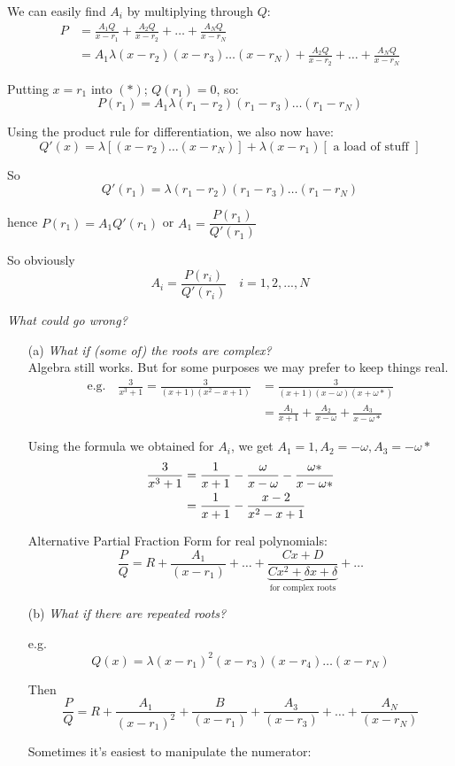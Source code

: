 \documentclass[twoside]{scrartcl}
\begin{document}
We can easily find $A_i$ by multiplying through $Q$:\vspace*{5pt}
\begin{align} \nonumber P &= \frac{A_1Q}{x-r_1} + \frac{A_2Q}{x-r_2} + \dots + \frac{A_NQ}{x-r_N}\\ \nonumber
&= A_1 \lambda(x-r_2)(x-r_3)\dots(x-r_N) + \frac{A_2Q}{x-r_2} + \dots + \frac{A_NQ}{x-r_N}  \tag{$*$}
\end{align}

Putting $x = r_1$ into $(*)$; $Q(r_1) = 0$, so:\vspace*{5pt}
\[P(r_1) = A_1 \lambda (r_1 - r_2)(r_1 - r_3)\dots(r_1 - r_N) \]

Using the product rule for differentiation, we also now have:
\[
Q'(x) = \lambda[(x-r_2)\dots(x-r_N)] + \lambda(x-r_1)[\text{ a load of stuff }]
\]

So \[Q'(r_1) = \lambda(r_1-r_2)(r_1-r_3)\dots(r_1-r_N)\] 

hence $P(r_1) = A_1Q'(r_1)$ or $A_1 = \dfrac{P(r_1)}{Q'(r_1)}$

So obviously \[\boxed{A_i = \dfrac{P(r_i)}{Q'(r_i)} \quad i = 1,2,...,N}\]\vspace*{5pt}

\emph{What could go wrong?}

\begin{itemize}
\item[(a)] \textit{What if (some of) the roots are complex?}\\
Algebra still works. But for some purposes we may prefer to keep things real.
 \begin{align*} \nonumber \text{e.g.}\quad \frac{3}{x^3+1} = \frac{3}{(x+1)(x^2 - x + 1)} &= \frac{3}{(x+1)(x-\omega)(x+\omega *)} \\ &= \frac{A_1}{x+1} + \frac{A_2}{x - \omega} + \frac{A_3}{x - \omega *}
 \end{align*}\vspace*{5pt}

Using the formula we obtained for $A_i$, we get $A_1 = 1, A_2 = -\omega, A_3 = -\omega *$
\begin{align} \nonumber \frac{3}{x^3 + 1} &= \frac{1}{x+1} - \frac{\omega}{x-\omega} - \frac{\omega *}{x - \omega *} \\\vspace*{5pt} \nonumber
&= \frac{1}{x+1}  - \frac{x-2}{x^2 - x + 1} \end{align}

Alternative Partial Fraction Form for real polynomials:
\[\frac{P}{Q} = R + \frac{A_1}{(x-r_1)} + \dots + \underbrace{\frac{Cx + D}{Cx^2 + \delta x + \delta}}_\text{for complex roots} + \dots \]

\item[(b)] \textit{What if there are repeated roots?}

e.g. 
\[Q(x) = \lambda(x-r_1)^2(x-r_3)(x-r_4)\dots(x-r_N)\]

Then 
\[\frac{P}{Q} = R + \frac{A_1}{(x-r_1)^2} + \frac{B}{(x-r_1)} + \frac{A_3}{(x-r_3)} + \dots + \frac{A_N}{(x-r_N)}\]

Sometimes it's easiest to manipulate the numerator:\\
\end{itemize}
\end{document}
